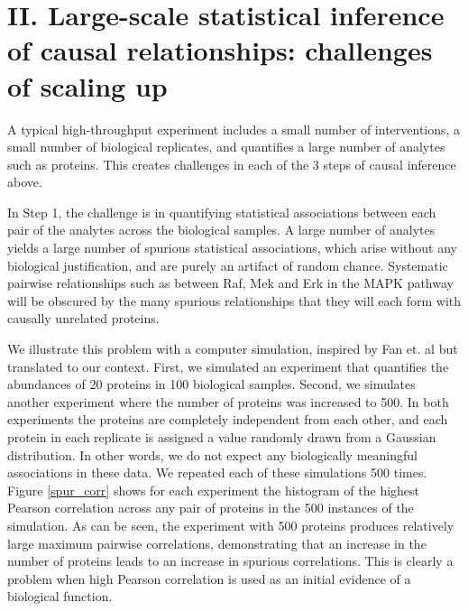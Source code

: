\documentclass[journal=jacsat,manuscript=article]{achemso}
\begin{document}
\section{II. Large-scale statistical inference of causal relationships: challenges of scaling up}

A typical high-throughput experiment includes a small number of interventions, a small number of biological replicates, and quantifies a large number of analytes such as proteins. This creates challenges in each of the 3 steps of causal inference above.

In Step 1, the challenge is in quantifying statistical associations between each pair of the analytes across the biological samples. A large number of analytes  yields a large number of spurious statistical associations, which arise without any biological justification, and are purely an artifact of random chance. Systematic pairwise relationships such as between Raf, Mek and Erk in the MAPK pathway will be obscured by the many spurious relationships that they will each form with causally unrelated proteins.

We illustrate this problem with a computer simulation, inspired by Fan et. al \cite{fan2014challenges} but translated to our context. First, we simulated an experiment that quantifies the abundances of 20 proteins in 100 biological samples.  Second, we simulates another experiment where the number of proteins was increased to 500.  In both experiments the proteins are completely independent from each other, and each protein in each replicate is assigned a value randomly drawn from a Gaussian distribution. In other words, we do not expect any biologically meaningful associations in these data. We repeated each of these simulations 500 times. Figure \ref{spur_corr} shows for each experiment the histogram of the highest Pearson correlation across any pair of proteins in the 500 instances of the simulation. As can be seen, the experiment with 500 proteins produces relatively large maximum pairwise correlations, demonstrating that an increase in the number of proteins leads to an increase in spurious correlations.  This is clearly a problem when high Pearson correlation is used as an initial evidence of a biological function.
\end{document}
